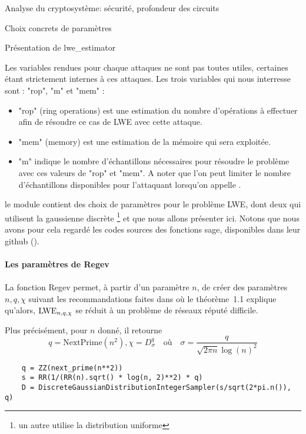 \begin{section}{Analyse du cryptosystème: sécurité, profondeur des circuits}
\begin{subsection}{Choix concrets de paramètres}
\begin{subsubsection}{Présentation de lwe\_estimator}
	\flushleft
	
	Les variables rendues pour chaque attaques ne sont pas toutes utiles, certaines étant strictement
	internes à ces attaques. Les trois variables qui nous interresse sont : "rop", "m" et "mem" :
	
	\begin{itemize}
	\item "rop" (ring operations) est une estimation du nombre d'opérations à effectuer afin de résoudre
	ce cas de LWE avec cette attaque.
	
	\item "mem" (memory) est une estimation de la mémoire qui sera exploitée.
	
	\item "m" indique le nombre d'échantillons nécessaires pour résoudre le problème avec ces valeurs de
	"rop" et "mem". A noter que l'on peut limiter le nombre d'échantillons disponibles pour l'attaquant
	lorsqu'on appelle .
	\end{itemize}

	le module  contient des choix de paramètres pour
	le problème LWE, dont deux qui utilisent la gaussienne discrète
	\footnote{un autre utilise la distribution uniforme}
	et que nous allons présenter ici. Notons que nous avons pour cela 
	regardé les codes 
	sources des fonctions sage, disponibles dans leur github (\cite{sage}).

	\paragraph{}
	\textbf{Les paramètres de Regev}
	\paragraph{}

	La fonction Regev permet, à partir d'un paramètre $n$, de 
	créer des paramètres $n, q, \chi$ suivant les recommandations  
	faites dans \cite{STOC:Regev05} où le théorème~1.1 explique 
	qu'alors, $\text{LWE}_{n,q,\chi}$ se réduit à un problème de réseaux réputé 
	difficile.

	Plus précisément, pour $n$ donné, il retourne
	\[q = \text{NextPrime}(n^2), \chi = D^q_\sigma\quad\text{où}\quad
		\sigma = \frac{q}{\sqrt{2 \pi n} \log(n)^2}\]

	\begin{lstlisting}
	q = ZZ(next_prime(n**2))
	s = RR(1/(RR(n).sqrt() * log(n, 2)**2) * q)
	D = DiscreteGaussianDistributionIntegerSampler(s/sqrt(2*pi.n()), q)
	\end{lstlisting}


\end{subsubsection}
\end{subsection}
\end{section}
